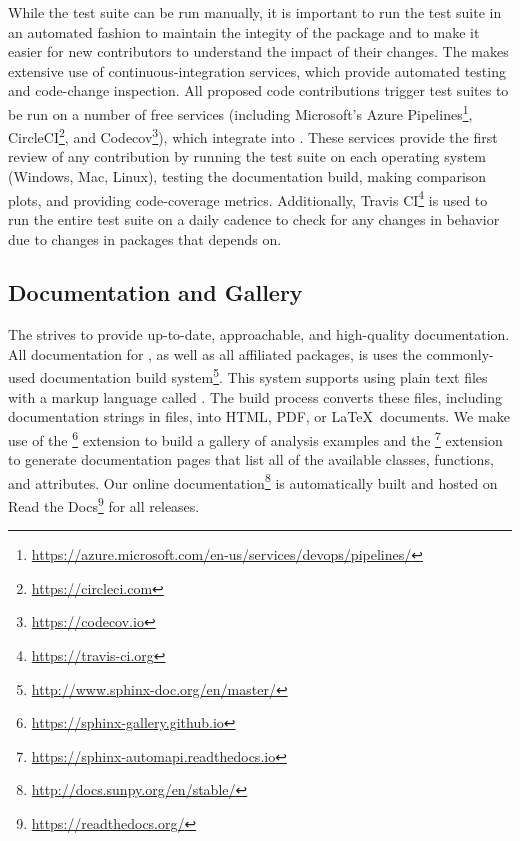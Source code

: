 While the test suite can be run manually, it is important to run the test suite in an automated fashion to maintain the integity of the package and to make it easier for new contributors to understand the impact of their changes.
The \sunpyproj makes extensive use of continuous-integration services, which provide automated testing and code-change inspection.
All proposed code contributions trigger test suites to be run on a number of free services (including
Microsoft's Azure Pipelines\footnote{\url{https://azure.microsoft.com/en-us/services/devops/pipelines/}}, CircleCI\footnote{\url{https://circleci.com}}, and Codecov\footnote{\url{https://codecov.io}}), which integrate into \github.
These services provide the first review of any contribution by running the test suite on each operating system (Windows, Mac, Linux), testing the documentation build, making comparison plots, and providing code-coverage metrics.
Additionally, Travis CI\footnote{\url{https://travis-ci.org}} is used to run the entire test suite on a daily cadence to check for any changes in behavior due to changes in packages that \sunpypkg depends on.

\subsection{Documentation and Gallery}
\label{sec:docs}

The \sunpyproj strives to provide up-to-date, approachable, and high-quality documentation.
All documentation for \sunpypkg, as well as all affiliated packages, is uses the commonly-used  documentation build system\footnote{\url{http://www.sphinx-doc.org/en/master/}}.
This system supports using plain text files with a markup language called .
The build process converts these files, including documentation strings in \python files, into HTML, PDF, or \LaTeX\ documents.
We make use of the \footnote{\url{https://sphinx-gallery.github.io}} extension to build a gallery of analysis examples and the \footnote{\url{https://sphinx-automapi.readthedocs.io}} extension to generate documentation pages that list all of the available classes, functions, and attributes.
Our online documentation\footnote{\url{http://docs.sunpy.org/en/stable/}} is automatically built and hosted on Read the Docs\footnote{\url{https://readthedocs.org/}} for all releases.
